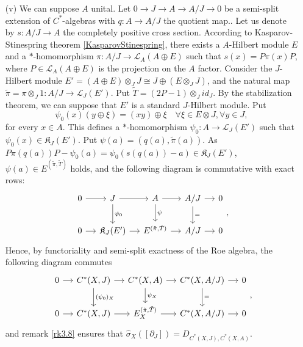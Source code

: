 \begin{dem}
\begin{enumerate}
\item[(v)] We can suppose $A$ unital. Let $0 \rightarrow J \rightarrow A \rightarrow A /J \rightarrow 0$ be a semi-split extension of $C^*$-algebras with $q:A\rightarrow A/J$ the quotient map.. Let us denote by $s : A/J \rightarrow A $ the completely positive cross section.  According to Kasparov-Stinespring theorem \ref{KasparovStinespring}, there exists a $A$-Hilbert module $E$ and a $*$-homomorphism $\pi : A/J \rightarrow \mathcal L_{A}(A\oplus E)$ such that $s(x) = P \pi(x) P$, where $P \in \mathcal L_{A}(A\oplus E)$ is the projection on the $A$ factor. Consider the $J$-Hilbert module $E' = (A\oplus E)\otimes_J J \cong J\oplus (E\otimes_J J)$, and the natural map $\tilde\pi =\pi\otimes_J 1: A/ J \rightarrow \mathcal L_{J}(E')$. Put $\tilde T= (2P-1)\otimes_J id_J$. By the stabilization theorem, we can suppose that $E'$ is a standard $J$-Hilbert module. 
Put 
\[\psi_0(x)(y \oplus \xi ) =  (xy) \oplus \xi\quad \forall \xi \in E\otimes J,\forall y\in J, \] 
for every $x\in A$. This defines a $*$-homomorphism $\psi_0 : A \rightarrow \mathcal L_J(E')$ such that $\psi_0(x)\in  \mathfrak K _J (E')$. Put $\psi ( a ) = (q(a), \tilde \pi (a))$. As $P\pi (q(a))P -\psi_0(a) = \psi_0( s(q(a)) - a )\in \mathfrak K_J(E')$, $\psi(a)\in E^{(\tilde\pi,\tilde T)}$ holds, and the following diagram is commutative with exact rows:
\[\begin{tikzcd}[column sep = small]
0\arrow{r} &J\arrow{r}\arrow{d}{\psi_0} & A \arrow{r}\arrow{d}{\psi}& A/J\arrow{r}\arrow{d}{=} & 0\\
0\arrow{r} & \mathfrak K_J(E')\arrow{r} & E^{(\tilde \pi, \tilde T)} \arrow{r}& A/J\arrow{r} & 0
\end{tikzcd},\]
Hence, by functoriality and semi-split exactness of the Roe algebra, the following diagram commutes
\[\begin{tikzcd}[column sep = small]
0\arrow{r} & C^*(X,J)\arrow{r}\arrow{d}{(\psi_0)_X} & C^*(X,A) \arrow{r}\arrow{d}{\psi_X}& C^*(X,A/J)\arrow{r}\arrow{d}{=} & 0\\
0\arrow{r} & C^*(X,J)\arrow{r} & E_X^{(\tilde \pi, \tilde T)} \arrow{r}& C^*(X,A/J)\arrow{r} & 0
\end{tikzcd},\]
and remark \ref{rk3.8} ensures that  $\hat\sigma_X([\partial_J]) = D_{C^*(X,J),C^*(X,A)}$.



\end{enumerate}
\end{dem}
